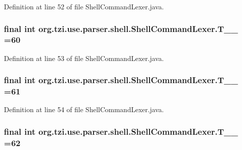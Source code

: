 Definition at line 52 of file Shell\-Command\-Lexer.\-java.

\hypertarget{classorg_1_1tzi_1_1use_1_1parser_1_1shell_1_1_shell_command_lexer_a69585f465fa490f9a02d260f04202694}{
\subsubsection[{T\-\_\-\-\_\-60}]{\setlength{\rightskip}{0pt plus 5cm}final int org.\-tzi.\-use.\-parser.\-shell.\-Shell\-Command\-Lexer.\-T\-\_\-\-\_ =60\hspace{0.3cm}{\ttfamily [static]}}}\label{classorg_1_1tzi_1_1use_1_1parser_1_1shell_1_1_shell_command_lexer_a69585f465fa490f9a02d260f04202694}


Definition at line 53 of file Shell\-Command\-Lexer.\-java.

\hypertarget{classorg_1_1tzi_1_1use_1_1parser_1_1shell_1_1_shell_command_lexer_abe478cc6cf05be369a11925d6df38dc1}{
\subsubsection[{T\-\_\-\-\_\-61}]{\setlength{\rightskip}{0pt plus 5cm}final int org.\-tzi.\-use.\-parser.\-shell.\-Shell\-Command\-Lexer.\-T\-\_\-\-\_ =61\hspace{0.3cm}{\ttfamily [static]}}}\label{classorg_1_1tzi_1_1use_1_1parser_1_1shell_1_1_shell_command_lexer_abe478cc6cf05be369a11925d6df38dc1}


Definition at line 54 of file Shell\-Command\-Lexer.\-java.

\hypertarget{classorg_1_1tzi_1_1use_1_1parser_1_1shell_1_1_shell_command_lexer_a5752919ac597194757de1ef58eff4689}{
\subsubsection[{T\-\_\-\-\_\-62}]{\setlength{\rightskip}{0pt plus 5cm}final int org.\-tzi.\-use.\-parser.\-shell.\-Shell\-Command\-Lexer.\-T\-\_\-\-\_ =62\hspace{0.3cm}{\ttfamily [static]}}}\label{classorg_1_1tzi_1_1use_1_1parser_1_1shell_1_1_shell_command_lexer_a5752919ac597194757de1ef58eff4689}


